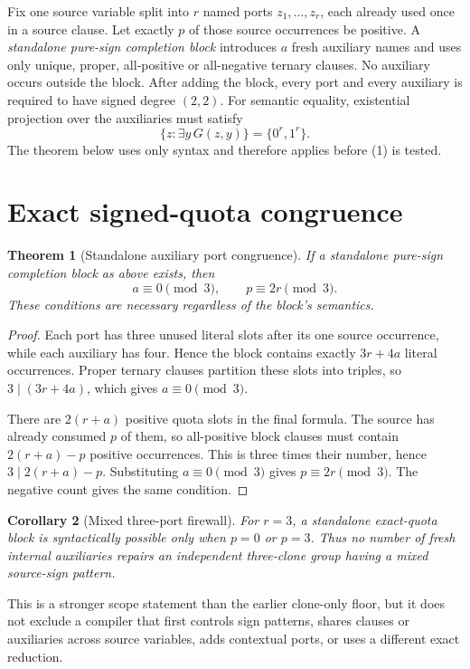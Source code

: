 \documentclass[11pt]{article}
\newtheorem{theorem}{Theorem}
\newtheorem{corollary}[theorem]{Corollary}
\begin{document}
Fix one source variable split into $r$ named ports
$z_1,\ldots,z_r$, each already used once in a source clause.  Let exactly $p$
of those source occurrences be positive.  A \emph{standalone pure-sign
completion block} introduces $a$ fresh auxiliary names and uses only unique,
proper, all-positive or all-negative ternary clauses.  No auxiliary occurs
outside the block.  After adding the block, every port and every auxiliary is
required to have signed degree $(2,2)$.  For semantic equality, existential
projection over the auxiliaries must satisfy
\[
 \{z:\exists y\,G(z,y)\}=\{0^r,1^r\}.
 \tag{1}
\]
The theorem below uses only syntax and therefore applies before (1) is tested.

\section{Exact signed-quota congruence}
\begin{theorem}[Standalone auxiliary port congruence]
If a standalone pure-sign completion block as above exists, then
\[
                 a\equiv0\pmod3,
        \qquad   p\equiv2r\pmod3.                 \tag{2}
\]
These conditions are necessary regardless of the block's semantics.
\end{theorem}
\begin{proof}
Each port has three unused literal slots after its one source occurrence,
while each auxiliary has four.  Hence the block contains exactly
$3r+4a$ literal occurrences.  Proper ternary clauses partition these slots
into triples, so $3\mid(3r+4a)$, which gives $a\equiv0\pmod3$.

There are $2(r+a)$ positive quota slots in the final formula.  The source has
already consumed $p$ of them, so all-positive block clauses must contain
$2(r+a)-p$ positive occurrences.  This is three times their number, hence
$3\mid 2(r+a)-p$.  Substituting $a\equiv0\pmod3$ gives
$p\equiv2r\pmod3$.  The negative count gives the same condition.
\end{proof}

\begin{corollary}[Mixed three-port firewall]
For $r=3$, a standalone exact-quota block is syntactically possible only when
$p=0$ or $p=3$.  Thus no number of fresh internal auxiliaries repairs an
independent three-clone group having a mixed source-sign pattern.
\end{corollary}
This is a stronger scope statement than the earlier clone-only floor, but it
does not exclude a compiler that first controls sign patterns, shares clauses
or auxiliaries across source variables, adds contextual ports, or uses a
different exact reduction.
\end{document}

